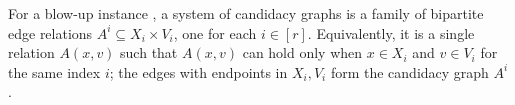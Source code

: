 \begin{definition}
For a blow-up instance , a system of candidacy graphs is a family of bipartite edge relations $A^i\subseteq X_i\times V_i$, one for each $i\in[r]$.  Equivalently, it is a single relation $A(x,v)$ such that $A(x,v)$ can hold only when $x\in X_i$ and $v\in V_i$ for the same index $i$; the edges with endpoints in $X_i,V_i$ form the candidacy graph $A^i$.
\end{definition}
